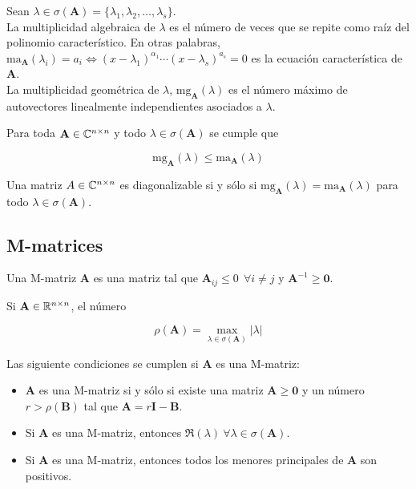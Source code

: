 \begin{defi}
Sean $\lambda \in \sigma(\mathbf{A}) = \{\lambda_1, \lambda_2, \dots, \lambda_s\}$.\\

La multiplicidad algebraica de $\lambda$ es el número de veces que se repite como raíz del polinomio característico. En otras palabras, $\mathrm{ma}_\mathbf{A}(\lambda_i) = a_i \iff (x-\lambda_1)^{\alpha_1} \cdots (x - \lambda_s)^{a_s}  = 0$ es la ecuación característica de $\mathbf{A}$.\\

La multiplicidad geométrica de $\lambda$, $\mathrm{mg}_\mathbf{A}(\lambda)$ es el número máximo de autovectores linealmente independientes asociados a $\lambda$.
\end{defi}

\begin{defi}
Para toda $\mathbf{A} \in \mathbb{C}^{n \times n}$ y todo $\lambda \in \sigma(\mathbf{A})$ se cumple que

\[ \mathrm{mg}_\mathbf{A}(\lambda) \leq \mathrm{ma}_\mathbf{A}(\lambda) \]
\end{defi}

\begin{teo}
Una matriz $A \in \mathbb{C}^{n \times n}$ es diagonalizable si y sólo si $\mathrm{mg}_\mathbf{A}(\lambda) = \mathrm{ma}_\mathbf{A}(\lambda)$ para todo $\lambda \in \sigma(\mathbf{A})$.
\end{teo}

\subsection{M-matrices}

\begin{defi}
Una M-matriz $\mathbf{A}$ es una matriz tal que $\mathbf{A}_{ij} \leq 0 \ \ \forall i \neq j$ y $\mathbf{A}^{-1} \geq \mathbf{0}$.
\end{defi}

\begin{defi}
Si $\mathbf{A} \in \mathbb{R}^{n\times n}$, el número 

\[\rho(\mathbf{A}) = \max_{\lambda \in \sigma(\mathbf{A})} |\lambda|\]
\end{defi}

\begin{prop}
Las siguiente condiciones se cumplen si $\mathbf{A}$ es una M-matriz:

\begin{itemize}
\item $\mathbf{A}$ es una M-matriz si y sólo si existe una matriz $\mathbf{A} \geq \mathbf{0}$ y un número $r > \rho(\mathbf{B})$ tal que $\mathbf{A} = r\mathbf{I} - \mathbf{B}$.
\item Si $\mathbf{A}$ es una M-matriz, entonces $\Re(\lambda) \ \forall \lambda \in \sigma(\mathbf{A})$.
\item Si $\mathbf{A}$ es una M-matriz, entonces todos los menores principales de $\mathbf{A}$ son positivos.
\end{itemize}
\end{prop}

